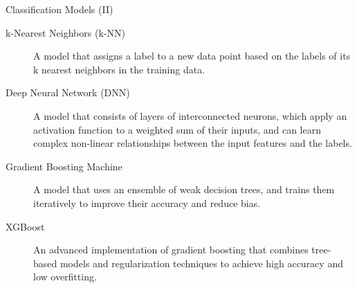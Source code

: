 \documentclass[aspectratio=169]{../latex_main/tntbeamer}  %
\begin{document}
    \begin{frame}[c]{Classification Models (II)}
        \begin{description}
            \item[k-Nearest Neighbors (k-NN)] A model that assigns a label to a new data point based on the labels of its k nearest neighbors in the training data.
            \item[Deep Neural Network (DNN)] A model that consists of layers of interconnected neurons, which apply an activation function to a weighted sum of their inputs, and can learn complex non-linear relationships between the input features and the labels.
            \item[Gradient Boosting Machine] A model that uses an ensemble of weak decision trees, and trains them iteratively to improve their accuracy and reduce bias.
            \item[XGBoost] An advanced implementation of gradient boosting that combines tree-based models and regularization techniques to achieve high accuracy and low overfitting.
        \end{description}

    \end{frame}
\end{document}
